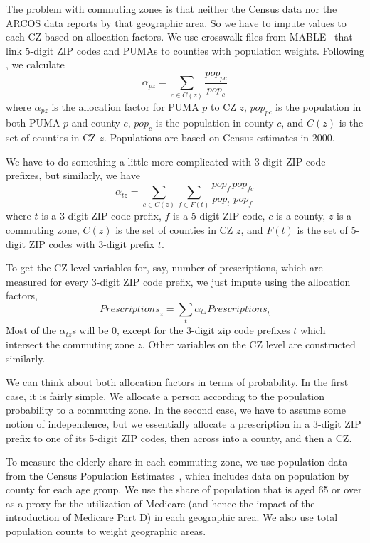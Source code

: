 \documentclass[12pt]{article}
\begin{document}
The problem with commuting zones is that neither the Census data nor the ARCOS data reports by that geographic area.  So we have to impute values to each CZ based on allocation factors.  We use crosswalk files from MABLE~ that link 5-digit ZIP codes and PUMAs to counties with population weights.  Following \textcite{dorn09}, we calculate \[ \alpha_{pz} = \sum_{c\in C(z)}\frac{\mathit{pop}_{pc}}{\mathit{pop}_c} \] where $\alpha_{pz}$ is the allocation factor for PUMA $p$ to CZ $z$, $\mathit{pop}_{pc}$ is the population in both PUMA $p$ and county $c$, $\mathit{pop}_c$ is the population in county $c$, and $C(z)$ is the set of counties in CZ $z$.  Populations are based on Census estimates in 2000.

We have to do something a little more complicated with 3-digit ZIP code prefixes, but similarly, we have \[ \alpha_{tz}=\sum_{c\in C(z)}\sum_{f\in F(t)}\frac{\mathit{pop}_f}{\mathit{pop}_t}\frac{\mathit{pop}_{fc}}{\mathit{pop}_f} \] where $t$ is a 3-digit ZIP code prefix, $f$ is a 5-digit ZIP code, $c$ is a county, $z$ is a commuting zone, $C(z)$ is the set of counties in CZ $z$, and $F(t)$ is the set of 5-digit ZIP codes with 3-digit prefix $t$.

To get the CZ level variables for, say, number of prescriptions, which are measured for every 3-digit ZIP code prefix, we just impute using the allocation factors,
\[ \mathit{Prescriptions}_{z} = \sum_{t} \alpha_{tz} \mathit{Prescriptions}_{t} \]
Most of the $\alpha_{tz}$s will be 0, except for the 3-digit zip code prefixes $t$ which intersect the commuting zone $z$.  Other variables on the CZ level are constructed similarly.

We can think about both allocation factors in terms of probability.  In the first case, it is fairly simple.  We allocate a person according to the population probability to a commuting zone.  In the second case, we have to assume some notion of independence, but we essentially allocate a prescription in a 3-digit ZIP prefix to one of its 5-digit ZIP codes, then across into a county, and then a CZ\@.

To measure the elderly share in each commuting zone, we use population data from the Census Population Estimates~, which includes data on population by county for each age group.  We use the share of population that is aged 65 or over as a proxy for the utilization of Medicare (and hence the impact of the introduction of Medicare Part D) in each geographic area.  We also use total population counts to weight geographic areas.
\end{document}
